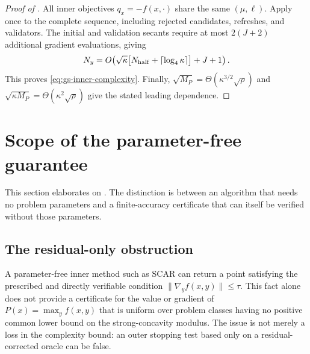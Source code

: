 \documentclass{article}
\begin{document}
\begin{proof}[Proof of ]
All inner objectives $q_x=-f(x,\cdot)$ share the same $(\mu,\ell)$.
Apply  once to the complete sequence,
including rejected candidates, refreshes, and validators.
The initial and validation secants require at most $2(J+2)$
additional gradient evaluations, giving
\begin{equation}\label{eq:gs-inner-explicit}
 N_y=O\!\left(
 \sqrt\kappa\bigl[N_{\rm half}+\lceil\log_4\kappa\rceil\bigr]+J+1
 \right).
\end{equation}
This proves \eqref{eq:gs-inner-complexity}.
Finally, $\sqrt{M_P}=\Theta(\kappa^{3/2}\sqrt\rho)$ and
$\sqrt{\kappa M_P}=\Theta(\kappa^2\sqrt\rho)$ give the stated leading
dependence.
\end{proof}

\section{Scope of the parameter-free guarantee}
\label{sec:parameter-free-scope}

This section elaborates on .
The distinction is between an algorithm that needs no problem
parameters and a finite-accuracy certificate that can itself be
verified without those parameters.

\subsection{The residual-only obstruction}
\label{subsec:scar-limitation}

A parameter-free inner method such as SCAR can return a point satisfying
the prescribed and directly verifiable condition
$\|\nabla_yf(x,y)\|\le\tau$.  This fact alone does not provide a
certificate for the value or gradient of
$P(x)=\max_y f(x,y)$ that is uniform over problem classes having no
positive common lower bound on the strong-concavity modulus.  The issue
is not merely a loss in the complexity bound: an outer stopping test
based only on a residual-corrected oracle can be false.
\end{document}
